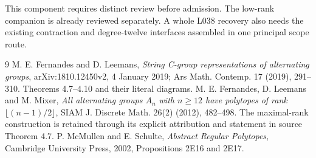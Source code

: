 \documentclass[11pt]{article}
\begin{document}
This component requires distinct review before admission. The
low-rank companion is already reviewed separately. A whole L038 recovery also needs the
existing contraction and degree-twelve interfaces assembled in
one principal scope route.

\begin{thebibliography}{9}
 M. E. Fernandes and D. Leemans,
\emph{String C-group representations of alternating groups},
arXiv:1810.12450v2, 4 January 2019; Ars Math. Contemp. 17 (2019),
291--310. Theorems 4.7--4.10 and their literal diagrams.
 M. E. Fernandes, D. Leemans and M. Mixer,
\emph{All alternating groups $A_n$ with $n\ge12$ have
polytopes of rank $\lfloor(n-1)/2\rfloor$},
SIAM J. Discrete Math. 26(2) (2012), 482--498.
The maximal-rank construction is retained through its explicit
attribution and statement in source Theorem 4.7.
 P. McMullen and E. Schulte,
\emph{Abstract Regular Polytopes}, Cambridge University Press,
2002, Propositions 2E16 and 2E17.
\end{thebibliography}
\end{document}
